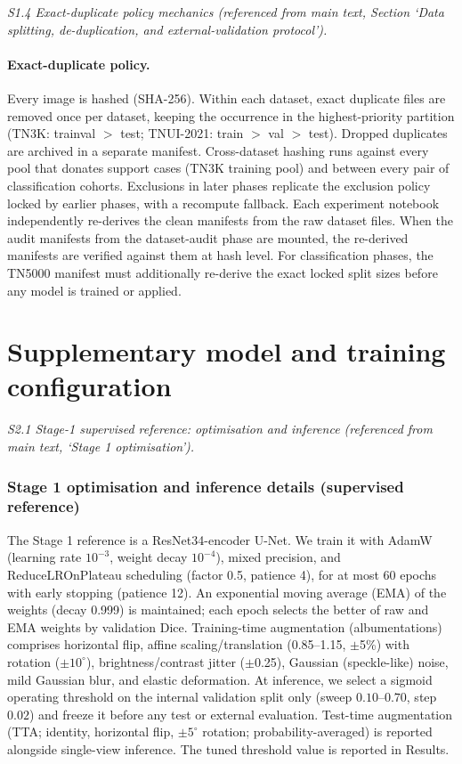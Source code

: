 \documentclass[11pt]{article}
\begin{document}
\noindent\emph{S1.4 Exact-duplicate policy mechanics (referenced from main text, Section `Data splitting, de-duplication, and external-validation protocol').}

\paragraph{Exact-duplicate policy.}
Every image is hashed (SHA-256). Within each dataset, exact duplicate files
are removed once per dataset, keeping the occurrence in the highest-priority
partition (TN3K: trainval $>$ test; TNUI-2021: train $>$ val $>$ test).
Dropped duplicates are archived in a separate manifest.
Cross-dataset hashing runs against every pool that donates support cases (TN3K
training pool) and between every pair of classification cohorts. Exclusions
in later phases replicate the exclusion policy locked by earlier phases,
with a recompute fallback. Each experiment notebook independently
re-derives the clean
manifests from the raw dataset files. When the audit manifests from the
dataset-audit phase are mounted, the re-derived manifests are verified
against them at hash level. For classification phases, the TN5000 manifest must additionally
re-derive the exact locked split sizes before any model is trained or
applied.


\section{Supplementary model and training configuration}\label{sm:config}

\noindent\emph{S2.1 Stage-1 supervised reference: optimisation and inference (referenced from main text, `Stage 1 optimisation').}

\subsubsection{Stage 1 optimisation and inference details (supervised
 reference)}


The Stage 1 reference is a ResNet34-encoder U-Net. We train it with AdamW
(learning rate $10^{-3}$, weight decay $10^{-4}$), mixed precision, and
ReduceLROnPlateau scheduling (factor 0.5, patience 4), for at most 60 epochs
with early stopping (patience 12). An exponential moving average (EMA) of
the weights (decay 0.999) is maintained; each epoch selects the better of
raw and EMA weights by validation Dice. Training-time augmentation
(albumentations) comprises horizontal flip, affine scaling/translation
(0.85--1.15, $\pm$5\%) with rotation ($\pm10^{\circ}$),
brightness/contrast jitter ($\pm$0.25), Gaussian (speckle-like) noise,
mild Gaussian blur, and elastic deformation. At inference, we select a sigmoid
operating threshold on the internal validation split only
(sweep $0.10$--$0.70$, step $0.02$) and freeze it before any test or external
evaluation. Test-time augmentation (TTA; identity, horizontal flip,
$\pm5^{\circ}$ rotation; probability-averaged) is reported alongside
single-view inference. The tuned threshold value is reported in Results.
\end{document}
